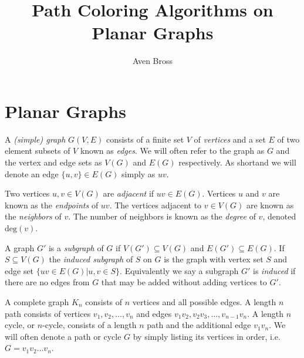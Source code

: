 \documentclass[letterpaper, 12pt]{amsart}
\title{Path Coloring Algorithms on Planar Graphs}
\author{Aven Bross}
\theoremstyle{definition}
\theoremstyle{definition}
\theoremstyle{thm}
\theoremstyle{definition}
\begin{document}
\maketitle

\section{Planar Graphs}

A \textit{(simple) graph} $G(V,E)$ consists of a finite set $V$ of
\textit{vertices} and a set $E$ of two element subsets of $V$ known as
\textit{edges}. We will often refer to the graph as $G$ and the vertex and
edge sets as $V(G)$ and $E(G)$ respectively. As shortand we will denote an edge
$\{u,v\}\in E(G)$ simply as $uv$.

Two vertices $u,v\in V(G)$ are \textit{adjacent}
if $uv\in E(G)$. Vertices $u$ and $v$ are known as the \textit{endpoints}
of $uv$. The  vertices adjacent to $v\in V(G)$ are known as the 
\textit{neighbors} of $v$. The number of neighbors is known as the
\textit{degree} of $v$, denoted $\text{deg}(v)$.

A graph $G'$ is a \textit{subgraph} of $G$ if $V(G')\subseteq V(G)$ and
$E(G')\subseteq E(G)$. If $S\subseteq V(G)$ the \textit{induced subgraph} of $S$
on $G$ is the graph with vertex set $S$ and edge set $\{uv\in E(G)|u,v\in S\}$.
Equivalently we say a subgraph $G'$ is \textit{induced} if there are no edges
from $G$ that may be added without adding vertices to $G'$.

A complete graph $K_n$ consists of $n$ vertices and all possible edges.
A length $n$ path consists of vertices $v_1,v_2,\ldots,v_n$ and edges $v_1v_2,
v_2v_3,\ldots,v_{n-1}v_n$. A length $n$ cycle, or $n$-cycle, consists of a
length $n$ path and the additional edge $v_1v_n$. We will often denote a path
or cycle $G$ by simply listing its vertices in order, i.e. $G=v_1v_2\ldots v_n$.
\end{document}
